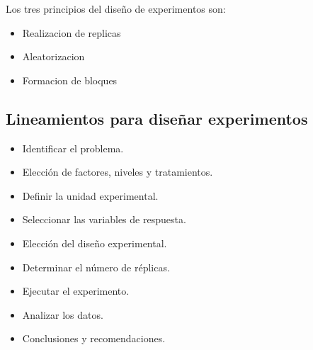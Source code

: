 \documentclass{article}
\begin{document}
Los tres principios del diseño de experimentos son:

\begin{itemize}
    \item Realizacion de replicas
    \item Aleatorizacion
    \item Formacion de bloques 
\end{itemize}

\subsection*{Lineamientos para diseñar experimentos}

\begin{itemize}
    \item Identificar el problema.
    \item Elección de factores, niveles y tratamientos.
    \item Definir la unidad experimental.
    \item Seleccionar las variables de respuesta.
    \item Elección del diseño experimental.
    \item Determinar el número de réplicas.
    \item Ejecutar el experimento.
    \item Analizar los datos.
    \item Conclusiones y recomendaciones.
\end{itemize}
\end{document}
